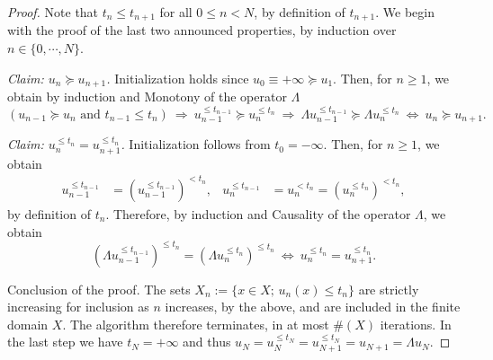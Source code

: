 \begin{proof}
Note that $t_n \leq t_{n+1}$ for all $0 \leq n < N$, by definition of $t_{n+1}$.
We begin with the proof of the last two announced properties, by induction over $n \in \{0, \cdots, N\}$. 

\emph{Claim: $u_n \succeq u_{n+1}$.} Initialization holds since $u_0 \equiv +\infty \succeq u_1$. Then, for $n\geq 1$, we obtain by induction and Monotony of the operator $\Lambda$
\begin{equation*}
	(u_{n-1} \succeq u_n \text{ and } t_{n-1} \leq t_n) \ \Rightarrow \
	u_{n-1}^{\leq t_{n-1}} \succeq u_n^{\leq t_n} \ \Rightarrow \
	\Lambda u_{n-1}^{\leq t_{n-1}} \succeq \Lambda u_n^{\leq t_n} \ \Leftrightarrow \
	u_n \succeq u_{n+1}.
\end{equation*}

\emph{Claim: $u_n^{\leq t_n} = u_{n+1}^{\leq t_n}$.} Initialization follows from $t_0 = -\infty$. Then, for $n\geq 1$, we obtain
\begin{align*}
	u_{n-1}^{\leq t_{n-1}}  &= (u_{n-1}^{\leq t_{n-1}})^{<t_n}, &
	u_n^{\leq t_{n-1}} &= u_n^{<t_n} = (u_n^{\leq t_n})^{<t_n},
\end{align*}
by definition of $t_n$.
Therefore, by induction and Causality of the operator $\Lambda$, we obtain
\begin{equation*}
	(\Lambda u_{n-1}^{\leq t_{n-1}})^{\leq t_n} = (\Lambda u_n^{\leq t_n})^{\leq t_n} \ \Leftrightarrow \
	u_n^{\leq t_n} = u_{n+1}^{\leq t_n}.
\end{equation*}

Conclusion of the proof. The sets $X_n := \{x \in X; \, u_n(x) \leq t_n\}$ are strictly increasing for inclusion as $n$ increases, by the above, and are included in the finite domain $X$. The algorithm therefore terminates, in at most $\#(X)$ iterations. In the last step we have $t_N = +\infty$ and thus $u_N = u_N^{\leq t_N} = u_{N+1}^{\leq t_N} = u_{N+1} = \Lambda u_N$.
\end{proof}


